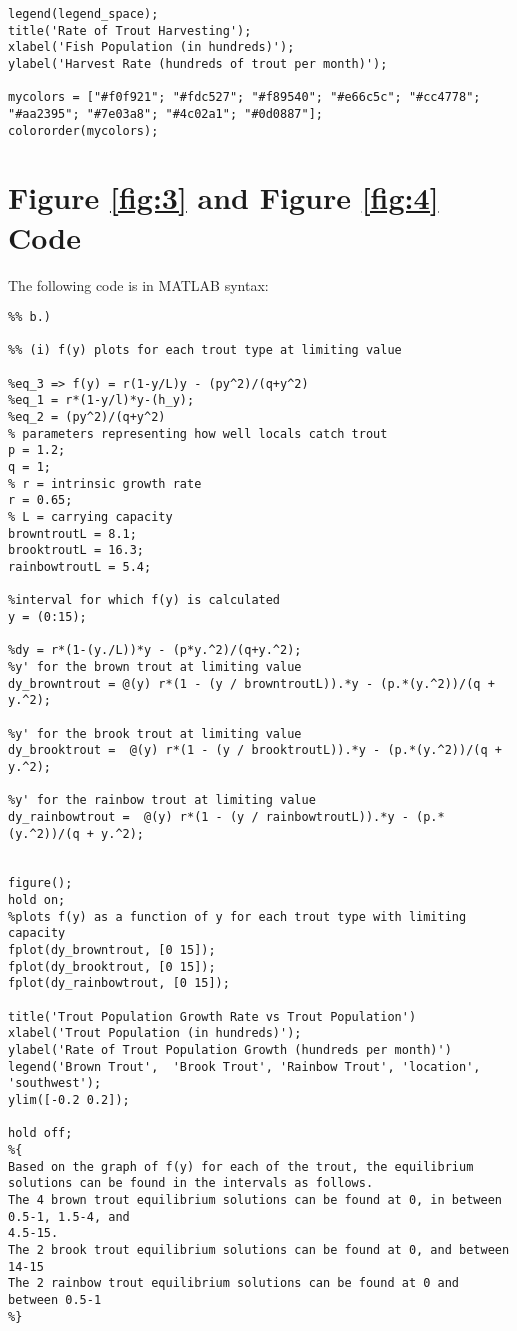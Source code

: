 \documentclass[letterpaper,12pt]{article}
\begin{document}
\begin{appendices}
\begin{spacing}{1}
\begin{lstlisting}
legend(legend_space);
title('Rate of Trout Harvesting');
xlabel('Fish Population (in hundreds)');
ylabel('Harvest Rate (hundreds of trout per month)');

mycolors = ["#f0f921"; "#fdc527"; "#f89540"; "#e66c5c"; "#cc4778"; "#aa2395"; "#7e03a8"; "#4c02a1"; "#0d0887"];
colororder(mycolors);
\end{lstlisting}
\end{spacing}
\newpage
\section{Figure \ref{fig:3} and Figure \ref{fig:4} Code} \label{appendix:C}
The following code is in MATLAB syntax:
\begin{spacing}{1}
\begin{lstlisting}
%% b.)

%% (i) f(y) plots for each trout type at limiting value

%eq_3 => f(y) = r(1-y/L)y - (py^2)/(q+y^2)
%eq_1 = r*(1-y/l)*y-(h_y);
%eq_2 = (py^2)/(q+y^2)
% parameters representing how well locals catch trout
p = 1.2;
q = 1;
% r = intrinsic growth rate
r = 0.65;
% L = carrying capacity
browntroutL = 8.1;
brooktroutL = 16.3;
rainbowtroutL = 5.4;

%interval for which f(y) is calculated 
y = (0:15);

%dy = r*(1-(y./L))*y - (p*y.^2)/(q+y.^2);
%y' for the brown trout at limiting value
dy_browntrout = @(y) r*(1 - (y / browntroutL)).*y - (p.*(y.^2))/(q + y.^2);

%y' for the brook trout at limiting value
dy_brooktrout =  @(y) r*(1 - (y / brooktroutL)).*y - (p.*(y.^2))/(q + y.^2);

%y' for the rainbow trout at limiting value
dy_rainbowtrout =  @(y) r*(1 - (y / rainbowtroutL)).*y - (p.*(y.^2))/(q + y.^2);


figure();
hold on;
%plots f(y) as a function of y for each trout type with limiting capacity
fplot(dy_browntrout, [0 15]);
fplot(dy_brooktrout, [0 15]);
fplot(dy_rainbowtrout, [0 15]);

title('Trout Population Growth Rate vs Trout Population')
xlabel('Trout Population (in hundreds)');
ylabel('Rate of Trout Population Growth (hundreds per month)')
legend('Brown Trout',  'Brook Trout', 'Rainbow Trout', 'location', 'southwest');
ylim([-0.2 0.2]);

hold off;
%{
Based on the graph of f(y) for each of the trout, the equilibrium
solutions can be found in the intervals as follows. 
The 4 brown trout equilibrium solutions can be found at 0, in between 0.5-1, 1.5-4, and
4.5-15.
The 2 brook trout equilibrium solutions can be found at 0, and between 14-15
The 2 rainbow trout equilibrium solutions can be found at 0 and between 0.5-1
%}


\end{lstlisting}
\end{spacing}
\end{appendices}
\end{document}
